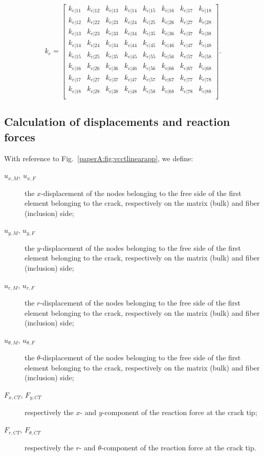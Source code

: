 \begin{equation}\label{paperA:eq:elstiffmatrix}
k_{e}=\begin{bmatrix}
k_{e|11}&k_{e|12}&k_{e|13}&k_{e|14}&k_{e|15}&k_{e|16}&k_{e|17}&k_{e|18}\\
k_{e|12}&k_{e|22}&k_{e|23}&k_{e|24}&k_{e|25}&k_{e|26}&k_{e|27}&k_{e|28}\\
k_{e|13}&k_{e|23}&k_{e|33}&k_{e|34}&k_{e|35}&k_{e|36}&k_{e|37}&k_{e|38}\\
k_{e|14}&k_{e|24}&k_{e|34}&k_{e|44}&k_{e|45}&k_{e|46}&k_{e|47}&k_{e|48}\\
k_{e|15}&k_{e|25}&k_{e|35}&k_{e|45}&k_{e|55}&k_{e|56}&k_{e|57}&k_{e|58}\\
k_{e|16}&k_{e|26}&k_{e|36}&k_{e|46}&k_{e|56}&k_{e|66}&k_{e|67}&k_{e|68}\\
k_{e|17}&k_{e|27}&k_{e|37}&k_{e|47}&k_{e|57}&k_{e|67}&k_{e|77}&k_{e|78}\\
k_{e|18}&k_{e|28}&k_{e|38}&k_{e|48}&k_{e|58}&k_{e|68}&k_{e|78}&k_{e|88}\\
\end{bmatrix}.
\end{equation}

\subsection{Calculation of displacements and reaction forces}

With reference to Fig.~\ref{paperA:fig:vcctlinearapp}, we define:

\begin{description}
\item[$u_{x,M}$, $u_{x,F}$] the $x$-displacement of the nodes belonging to the free side of the first element belonging to the crack, respectively on the matrix (bulk) and fiber (inclusion) side;
\item[$u_{y,M}$, $u_{y,F}$] the $y$-displacement of the nodes belonging to the free side of the first element belonging to the crack, respectively on the matrix (bulk) and fiber (inclusion) side;
\item[$u_{r,M}$, $u_{r,F}$] the $r$-displacement of the nodes belonging to the free side of the first element belonging to the crack, respectively on the matrix (bulk) and fiber (inclusion) side;
\item[$u_{\theta,M}$, $u_{\theta,F}$] the $\theta$-displacement of the nodes belonging to the free side of the first element belonging to the crack, respectively on the matrix (bulk) and fiber (inclusion) side;
\item[$F_{x,CT}$, $F_{y,CT}$] respectively the $x$- and $y$-component of the reaction force at the crack tip;
\item[$F_{r,CT}$, $F_{\theta,CT}$] respectively the $r$- and $\theta$-component of the reaction force at the crack tip.
\end{description}

